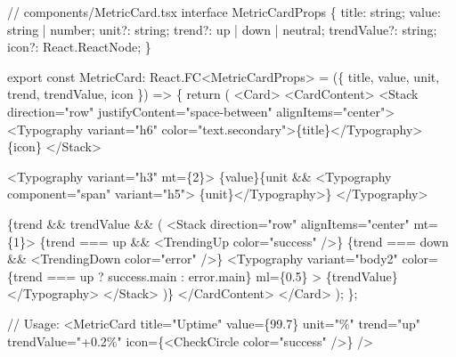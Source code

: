 \documentclass[
]{article}
\newenvironment{Shaded}{\begin{snugshade}}{\end{snugshade}}
\newcommand{\NormalTok}[1]{#1}
\begin{document}
\begin{Shaded}
\begin{Highlighting}[]
\NormalTok{// components/MetricCard.tsx}
\NormalTok{interface MetricCardProps \{}
\NormalTok{  title: string;}
\NormalTok{  value: string | number;}
\NormalTok{  unit?: string;}
\NormalTok{  trend?: \textquotesingle{}up\textquotesingle{} | \textquotesingle{}down\textquotesingle{} | \textquotesingle{}neutral\textquotesingle{};}
\NormalTok{  trendValue?: string;}
\NormalTok{  icon?: React.ReactNode;}
\NormalTok{\}}

\NormalTok{export const MetricCard: React.FC\textless{}MetricCardProps\textgreater{} = (\{}
\NormalTok{  title, value, unit, trend, trendValue, icon}
\NormalTok{\}) =\textgreater{} \{}
\NormalTok{  return (}
\NormalTok{    \textless{}Card\textgreater{}}
\NormalTok{      \textless{}CardContent\textgreater{}}
\NormalTok{        \textless{}Stack direction="row" justifyContent="space{-}between" alignItems="center"\textgreater{}}
\NormalTok{          \textless{}Typography variant="h6" color="text.secondary"\textgreater{}\{title\}\textless{}/Typography\textgreater{}}
\NormalTok{          \{icon\}}
\NormalTok{        \textless{}/Stack\textgreater{}}

\NormalTok{        \textless{}Typography variant="h3" mt=\{2\}\textgreater{}}
\NormalTok{          \{value\}\{unit \&\& \textless{}Typography component="span" variant="h5"\textgreater{} \{unit\}\textless{}/Typography\textgreater{}\}}
\NormalTok{        \textless{}/Typography\textgreater{}}

\NormalTok{        \{trend \&\& trendValue \&\& (}
\NormalTok{          \textless{}Stack direction="row" alignItems="center" mt=\{1\}\textgreater{}}
\NormalTok{            \{trend === \textquotesingle{}up\textquotesingle{} \&\& \textless{}TrendingUp color="success" /\textgreater{}\}}
\NormalTok{            \{trend === \textquotesingle{}down\textquotesingle{} \&\& \textless{}TrendingDown color="error" /\textgreater{}\}}
\NormalTok{            \textless{}Typography}
\NormalTok{              variant="body2"}
\NormalTok{              color=\{trend === \textquotesingle{}up\textquotesingle{} ? \textquotesingle{}success.main\textquotesingle{} : \textquotesingle{}error.main\textquotesingle{}\}}
\NormalTok{              ml=\{0.5\}}
\NormalTok{            \textgreater{}}
\NormalTok{              \{trendValue\}}
\NormalTok{            \textless{}/Typography\textgreater{}}
\NormalTok{          \textless{}/Stack\textgreater{}}
\NormalTok{        )\}}
\NormalTok{      \textless{}/CardContent\textgreater{}}
\NormalTok{    \textless{}/Card\textgreater{}}
\NormalTok{  );}
\NormalTok{\};}

\NormalTok{// Usage:}
\NormalTok{\textless{}MetricCard}
\NormalTok{  title="Uptime"}
\NormalTok{  value=\{99.7\}}
\NormalTok{  unit="\%"}
\NormalTok{  trend="up"}
\NormalTok{  trendValue="+0.2\%"}
\NormalTok{  icon=\{\textless{}CheckCircle color="success" /\textgreater{}\}}
\NormalTok{/\textgreater{}}
\end{Highlighting}
\end{Shaded}
\end{document}
